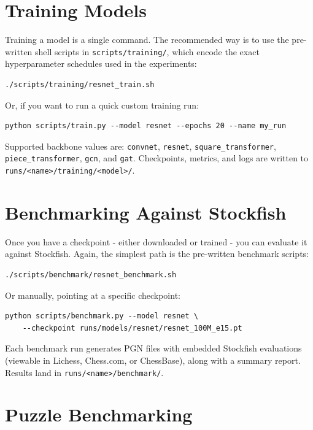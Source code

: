 \section{Training Models}

Training a model is a single command. The recommended way is to use the pre-written shell scripts in \texttt{scripts/training/}, which encode the exact hyperparameter schedules used in the experiments:

\begin{verbatim}
./scripts/training/resnet_train.sh
\end{verbatim}

Or, if you want to run a quick custom training run:

\begin{verbatim}
python scripts/train.py --model resnet --epochs 20 --name my_run
\end{verbatim}

Supported backbone values are: \texttt{convnet}, \texttt{resnet}, \texttt{square\_transformer}, \texttt{piece\_transformer}, \texttt{gcn}, and \texttt{gat}. Checkpoints, metrics, and logs are written to \texttt{runs/<name>/training/<model>/}.

\section{Benchmarking Against Stockfish}

Once you have a checkpoint - either downloaded or trained - you can evaluate it against Stockfish. Again, the simplest path is the pre-written benchmark scripts:

\begin{verbatim}
./scripts/benchmark/resnet_benchmark.sh
\end{verbatim}

Or manually, pointing at a specific checkpoint:

\begin{verbatim}
python scripts/benchmark.py --model resnet \
    --checkpoint runs/models/resnet/resnet_100M_e15.pt
\end{verbatim}

Each benchmark run generates PGN files with embedded Stockfish evaluations (viewable in Lichess, Chess.com, or ChessBase), along with a summary report. Results land in \texttt{runs/<name>/benchmark/}.

\section{Puzzle Benchmarking}

